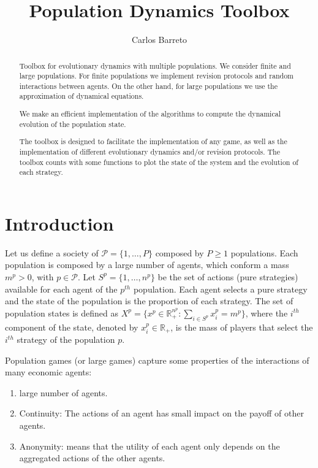 \documentclass[a4paper,10pt]{article}
\title{Population Dynamics Toolbox}
\author{Carlos Barreto}
\def\th{^{th}}
\newcommand{\pop}{\mathcal{P}}
\begin{document}
\maketitle



\begin{abstract}
 Toolbox for evolutionary dynamics with multiple populations. We consider finite and large populations. For finite populations we implement revision protocols and random interactions between agents. On the other hand, for large populations we use the approximation of dynamical equations. 
 
 We make an efficient implementation of the algorithms to compute the dynamical evolution of the population state.
 
 The toolbox is designed to facilitate the implementation of any game, as well as the implementation of different evolutionary dynamics and/or revision protocols. The toolbox counts with some functions to plot the state of the system and the evolution of each strategy.
 
 
 
 
 
\end{abstract}


\tableofcontents



\section{Introduction}



Let us define a society of $\pop = \{ 1, \ldots, P\}$ composed by $P \geq 1$ populations. Each population is composed by a large number of agents, which conform a mass $m^p > 0$, with $p \in \pop$. 
Let $S^p = \{ 1, \ldots, n^p \}$ be the set of actions (pure strategies) available for each agent of the $p\th$ population. 
Each agent selects a pure strategy and the state of the population is the proportion of each strategy. The set of population states is defined as $X^p = \{ x^p \in \mathbb{R}_+^{n^p} : \sum_{i \in S^p} x_i^p = m^p \}$, where the $i\th$ component of the state, denoted by $x_i^p \in \mathbb{R}_+$, is the mass of players that select the $i\th$ strategy of the population $p$.

Population games (or large games) capture some properties of the interactions of many economic agents:

\begin{enumerate}
\item large number of agents.
\item Continuity: The actions of an agent has small impact on the payoff of other agents.
\item Anonymity: means that the utility of each agent only depends on the aggregated actions of the other agents.
\end{enumerate}
\end{document}
